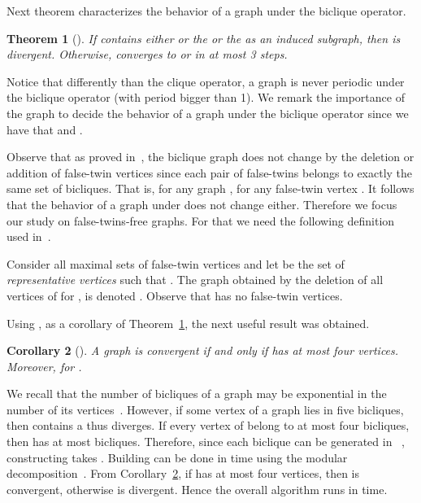 \documentclass[12pt]{article}
\newtheorem{theorem}{Theorem}[section]
\newtheorem{corollary}[theorem]{Corollary}
\begin{document}
Next theorem characterizes the behavior of a graph under the biclique operator.

\begin{theorem}[\cite{marinayo}] \label{divergencia}
If  contains either  or the  or the  as an induced subgraph, then  is divergent. 
Otherwise,   converges to  or  in at most 3 steps.
\end{theorem}

Notice that differently than the clique operator, a graph is never periodic under the biclique operator (with period bigger than 1). 
We remark the importance of the graph  to decide the behavior of a graph under the biclique operator since we have that 
 and .

Observe that as proved in~\cite{marinayo}, the biclique graph does not change by the deletion or addition of false-twin vertices since each pair of 
false-twins belongs to exactly the same set of bicliques. That is, for any graph ,  for any false-twin vertex . It follows that the behavior of a graph under  does not change either. Therefore we focus our study on false-twins-free graphs. For that we need the following definition used in~\cite{marinayo}.

Consider all maximal sets of false-twin vertices  and let  be the set of \emph{representative vertices} such that . The graph obtained by the deletion of all vertices of  for , is denoted . Observe that  has no false-twin vertices.

Using , as a corollary of Theorem~\ref{divergencia}, the next useful result was obtained.

\begin{corollary}[\cite{marinayo}]\label{contraccion}
A graph  is convergent if and only if  has at most four vertices. Moreover,  for .
\end{corollary}

We recall that the number of bicliques of a graph may be exponential in the number of its vertices~\cite{PrisnerC2000}. However, if some vertex of a 
graph  lies in five bicliques, then  contains a  thus  diverges. If every vertex of  belong to at most four bicliques, then  has at 
most  bicliques. Therefore, since each biclique can be generated in ~\cite{DiasFigueiredoSzwarcfiterTCS2005,DiasFigueiredoSzwarcfiterDAM2007}, 
constructing  takes . Building  can be done in  time using the modular decomposition~\cite{modulardecomp}. From 
Corollary~\ref{contraccion}, if  has at most four vertices, then  is convergent, otherwise  is divergent. Hence the overall algorithm 
runs in  time.
\end{document}
